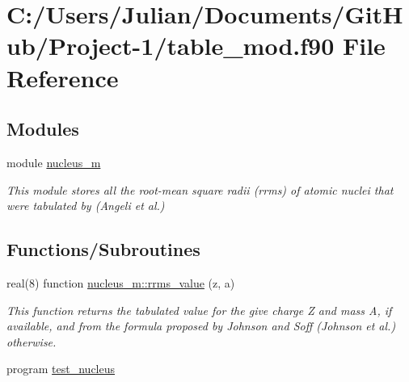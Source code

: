 \hypertarget{table__mod_8f90}{}\section{C\+:/\+Users/\+Julian/\+Documents/\+Git\+Hub/\+Project-\/1/table\+\_\+mod.f90 File Reference}
\label{table__mod_8f90}
\subsection*{Modules}
\begin{DoxyCompactItemize}
\item 
module \mbox{\hyperlink{namespacenucleus__m}{nucleus\+\_\+m}}
\begin{DoxyCompactList}\small\item\em This module stores all the root-\/mean square radii (rrms) of atomic nuclei that were tabulated by (Angeli et al.) \end{DoxyCompactList}\end{DoxyCompactItemize}
\subsection*{Functions/\+Subroutines}
\begin{DoxyCompactItemize}
\item 
real(8) function \mbox{\hyperlink{namespacenucleus__m_a83e8714be10756711874d134c66bcf73}{nucleus\+\_\+m\+::rrms\+\_\+value}} (z, a)
\begin{DoxyCompactList}\small\item\em This function returns the tabulated value for the give charge Z and mass A, if available, and from the formula proposed by Johnson and Soff (Johnson et al.) otherwise. \end{DoxyCompactList}\item 
program \mbox{\hyperlink{table__mod_8f90_a8ebb53a70bcfe3c94dbfbae3e3f52cba}{test\+\_\+nucleus}}
\end{DoxyCompactItemize}
